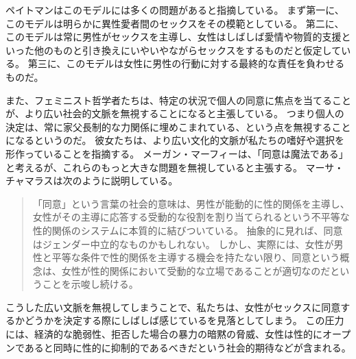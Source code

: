 \documentclass[paper=a4,book,openany]{jlreq}
\newcommand{\ig}[1]{}           %
\begin{document}
ペイトマンはこのモデルには多くの問題があると指摘している。
まず第一に、このモデルは明らかに異性愛者間のセックスをその模範としている。
第二に、このモデルは常に男性がセックスを主導し、女性はしばしば愛情や物質的支援といった他のものと引き換えにいやいやながらセックスをするものだと仮定している。
第三に、このモデルは女性に男性の行動に対する最終的な責任を負わせるものだ。

また、フェミニスト哲学者たちは、特定の状況で個人の同意に焦点を当てることが、より広い社会的文脈を無視することになると主張している。
つまり個人の決定は、常に家父長制的な力関係に埋めこまれている、という点を無視することになるというのだ。
彼女たちは、より広い文化的文脈が私たちの嗜好や選択を形作っていることを指摘する。
メーガン・マーフィー\ig{Meghan Murphy}は、「同意は魔法である」と考えるが、これらのもっと大きな問題を無視していると主張する\citep{murphy13:_tyran_consen}。
マーサ・チャマラスは次のように説明している。

\begin{quote}
  「同意」という言葉の社会的意味は、男性が能動的に性的関係を主導し、女性がその主導に応答する受動的な役割を割り当てられるという不平等な性的関係のシステムに本質的に結びついている。
抽象的に見れば、同意はジェンダー中立的なものかもしれない。
しかし、実際には、女性が男性と平等な条件で性的関係を主導する機会を持たない限り、同意という概念は、女性が性的関係において受動的な立場であることが適切なのだということを示唆し続ける。
\citep[pp.814-815]{chamallas88:_consen_equal_legalb}
\end{quote}

こうした広い文脈を無視してしまうことで、私たちは、女性がセックスに同意するかどうかを決定する際にしばしば感じているを見落としてしまう。
この圧力には、経済的な脆弱性、拒否した場合の暴力の暗黙の脅威、女性は性的にオープンであると同時に性的に抑制的であるべきだという社会的期待などが含まれる。
\end{document}
